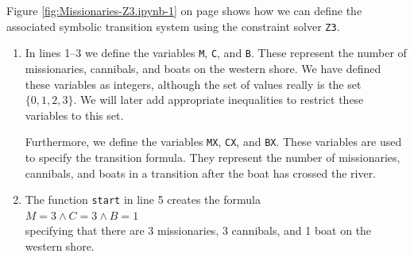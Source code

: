 Figure \ref{fig:Missionaries-Z3.ipynb-1} on page \pageref{fig:Missionaries-Z3.ipynb-1} shows how we can define
the associated symbolic transition system using the constraint solver \texttt{Z3}.
\begin{enumerate}
\item In lines 1--3 we define the variables \texttt{M}, \texttt{C}, and \texttt{B}.  These represent the
      number of missionaries, cannibals, and boats on the western shore.  We have defined these variables as
      integers, although the set of values really is the set $\{0,1,2,3\}$.  We will later add appropriate
      inequalities to restrict these variables to this set.

      Furthermore, we define the variables \texttt{MX}, \texttt{CX}, and \texttt{BX}.  These variables are used
      to specify the transition formula.  They represent the
      number of missionaries, cannibals, and boats in a transition after the boat has crossed the river. 
\item The function \texttt{start} in line 5 creates the formula
      \\[0.2cm]
      \hspace*{1.3cm}
      $M = 3 \wedge C = 3 \wedge B = 1$
      \\[0.2cm]
      specifying that there are 3 missionaries, 3 cannibals, and 1 boat on the western shore.


\end{enumerate}
